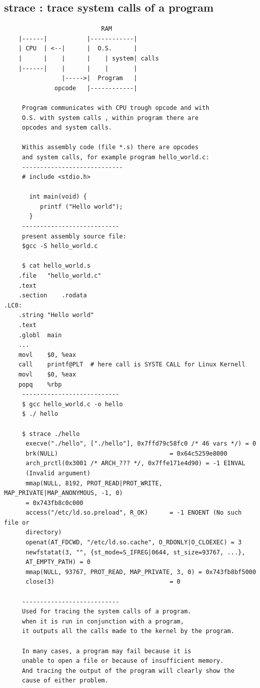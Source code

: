 \documentclass[a4paper,12pt]{article}
\begin{document}
\subsection{strace  :  trace system calls of a program }
\begin{verbatim}
                           RAM
    |------|           |------------|
    | CPU  | <--|      |  O.S.      |
    |      |    |      |    | system| calls
    |------|    |      |    |       | 
                |----->|  Program   |
              opcode   |------------|
     
     Program communicates with CPU trough opcode and with
     O.S. with system calls , within program there are 
     opcodes and system calls.
     
     Withis assembly code (file *.s) there are opcodes
     and system calls, for example program hello_world.c:
     ----------------------------     
     # include <stdio.h>

       int main(void) {
          printf ("Hello world");
       }
     ---------------------------
     present assembly source file:     
     $gcc -S hello_world.c
     
     $ cat hello_world.s
	.file	"hello_world.c"
	.text
	.section	.rodata
.LC0:
	.string	"Hello world"
	.text
	.globl	main
	...
	movl	$0, %eax
	call	printf@PLT  # here call is SYSTE CALL for Linux Kernell
	movl	$0, %eax
	popq	%rbp
     --------------------------- 
     $ gcc hello_world.c -o hello
     $ ./ hello
     
     $ strace ./hello
      execve("./hello", ["./hello"], 0x7ffd79c58fc0 /* 46 vars */) = 0
      brk(NULL)                               = 0x64c5259e8000
      arch_prctl(0x3001 /* ARCH_??? */, 0x7ffe171e4d90) = -1 EINVAL 
      (Invalid argument)
      mmap(NULL, 8192, PROT_READ|PROT_WRITE, MAP_PRIVATE|MAP_ANONYMOUS, -1, 0)    
      = 0x743fb8c0c000
      access("/etc/ld.so.preload", R_OK)      = -1 ENOENT (No such file or    
      directory)
      openat(AT_FDCWD, "/etc/ld.so.cache", O_RDONLY|O_CLOEXEC) = 3
      newfstatat(3, "", {st_mode=S_IFREG|0644, st_size=93767, ...}, 
      AT_EMPTY_PATH) = 0
      mmap(NULL, 93767, PROT_READ, MAP_PRIVATE, 3, 0) = 0x743fb8bf5000
      close(3)                                = 0

     ---------------------------
     Used for tracing the system calls of a program.
     when it is run in conjunction with a program, 
     it outputs all the calls made to the kernel by the program.

     In many cases, a program may fail because it is
     unable to open a file or because of insufficient memory. 
     And tracing the output of the program will clearly show the 
     cause of either problem.
     

\end{verbatim}
\end{document}
